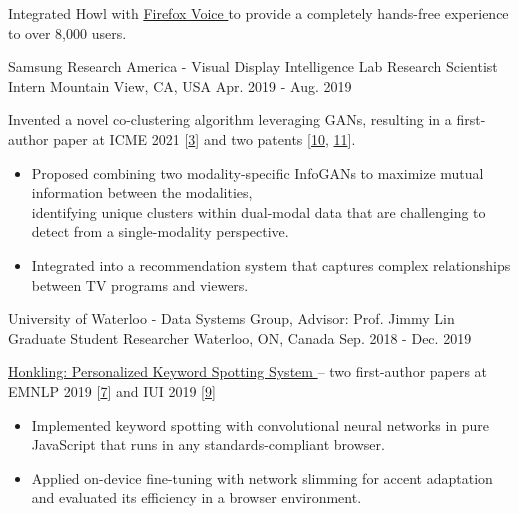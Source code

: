 \begin{cventries}
{\begin{cvitems}
\item {Integrated Howl with \href{https://github.com/mozilla-extensions/firefox-voice}{Firefox Voice {\small \faGithub}} to provide a completely hands-free experience to over 8,000 users.}
\end{cvitems}
}
\cventry
{Samsung Research America - Visual Display Intelligence Lab} %
{Research Scientist Intern} %
{Mountain View, CA, USA} %
{Apr. 2019 - Aug. 2019} %
{ %
\begin{cvitems}
\item {Invented a novel co-clustering algorithm leveraging GANs, resulting in a first-author paper at ICME 2021 [\hyperlink{CI-GAN:ICME}{3}] and two patents [\hyperlink{CI-GAN:International}{10}, \hyperlink{CI-GAN:US}{11}].}
\begin{itemize}[label=$\cdot$,leftmargin=0.7em]
\item {Proposed combining two modality-specific InfoGANs to maximize mutual information between the modalities, \\ identifying unique clusters within dual-modal data that are challenging to detect from a single-modality perspective.}
\item {Integrated into a recommendation system that captures complex relationships between TV programs and viewers.}
\end{itemize}
\end{cvitems}
}
\cventry
{University of Waterloo - Data Systems Group, Advisor: Prof. Jimmy Lin} %
{Graduate Student Researcher} %
{Waterloo, ON, Canada} %
{Sep. 2018 - Dec. 2019} %
{ %
\begin{cvitems}
\item {\href{https://github.com/castorini/honkling}{Honkling: Personalized Keyword Spotting System {\small \faGithub}} -- two first-author papers at EMNLP 2019 [\hyperlink{honkling:EMNLP}{7}] and IUI 2019 [\hyperlink{honkling:IUI}{9}]}
\begin{itemize}[label=$\cdot$,leftmargin=0.7em]
\item {Implemented keyword spotting with convolutional neural networks in pure JavaScript that runs in any standards-compliant browser.}
\item {Applied on-device fine-tuning with network slimming for accent adaptation and evaluated its efficiency in a browser environment.}

\end{itemize}
\end{cvitems}}
\end{cventries}
